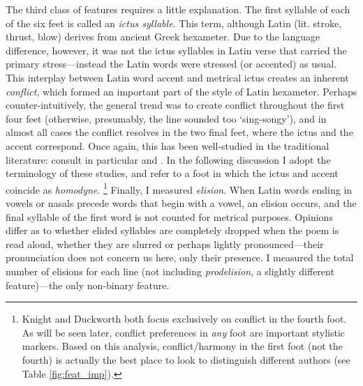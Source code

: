 \documentclass[11pt,a4paper]{scrartcl} %
\begin{document}
{The third class of features requires a little explanation. The first syllable of each of the six feet is called an \textit{ictus syllable}. This term, although Latin (lit. stroke, thrust, blow) derives from ancient Greek hexameter. Due to the language difference, however, it was not the ictus syllables in Latin verse that carried the primary stress---instead the Latin words were stressed (or accented) as usual. This interplay between Latin word accent and metrical ictus creates an inherent \textit{conflict}, which formed an important part of the style of Latin hexameter. Perhaps counter-intuitively, the general trend was to create conflict throughout the first four feet (otherwise, presumably, the line sounded too `sing-songy'), and in almost all cases the conflict resolves in the two final feet, where the ictus and the accent correspond. Once again, this has been well-studied in the traditional literature: consult in particular  and . In the following discussion I adopt the terminology of these studies, and refer to a foot in which the ictus and accent coincide as \textit{homodyne}.%
\footnote{Knight and Duckworth both focus exclusively on conflict in the fourth foot. As will be seen later, conflict preferences in \textit{any} foot are important stylistic markers. Based on this analysis, conflict/harmony in the first foot (not the fourth) is actually the best place to look to distinguish different authors (see Table \ref{fig:feat_imp}).}
Finally, I measured \textit{elision}. When Latin words ending in vowels or nasals precede words that begin with a vowel, an elision occurs, and the final syllable of the first word is not counted for metrical purposes. Opinions differ as to whether elided syllables are completely dropped when the poem is read aloud, whether they are slurred or perhaps lightly pronounced---their pronunciation does not concern us here, only their presence. I measured the total number of elisions for each line (not including \textit{prodelision}, a slightly different feature)---the only non-binary feature.

}
\end{document}
